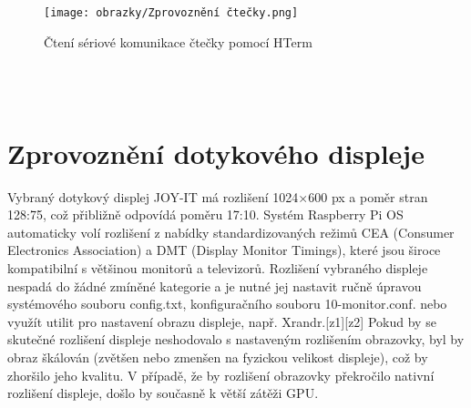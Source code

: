 \begin{figure}[h]
    \begin{center}
        \texttt{[image: obrazky/Zprovoznění čtečky.png]}
    \end{center}
    \caption{Čtení sériové komunikace čtečky pomocí HTerm}
    \label{Zprovoznění čtečky}
\end{figure}

\\\\


\section{Zprovoznění dotykového displeje}

Vybraný dotykový displej JOY-IT má rozlišení 1024×600 px a poměr stran 128:75, což přibližně odpovídá poměru 17:10. Systém Raspberry Pi OS automaticky volí rozlišení z nabídky standardizovaných režimů CEA (Consumer Electronics Association) a DMT (Display Monitor Timings), které jsou široce kompatibilní s většinou monitorů a televizorů. Rozlišení vybraného displeje nespadá do žádné zmíněné kategorie a je nutné jej nastavit ručně úpravou systémového souboru config.txt, konfiguračního souboru 10-monitor.conf. nebo využít utilit pro nastavení obrazu displeje, např. Xrandr.[z1][z2]
Pokud by se skutečné rozlišení displeje neshodovalo s nastaveným rozlišením obrazovky, byl by obraz škálován (zvětšen nebo zmenšen na fyzickou velikost displeje), což by zhoršilo jeho kvalitu. V případě, že by rozlišení obrazovky překročilo nativní rozlišení displeje, došlo by současně k větší zátěži GPU.

